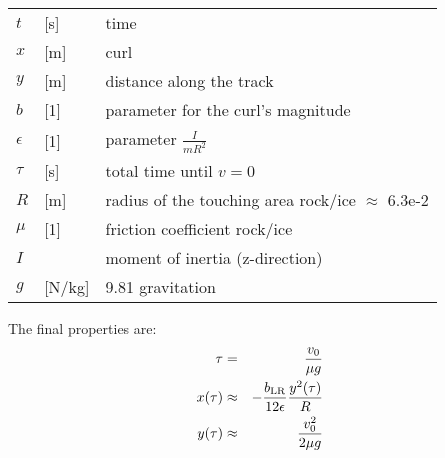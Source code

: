 \bigskip
\begin{tabular}{lll}
$t$		& [s] & time \\
$x$		& [m] & curl \\
$y$		& [m] & distance along the track \\
$b$ 	& [1] & parameter for the curl's magnitude \\
$\epsilon$	& [1] & parameter $ \frac{ I }{ mR^2 } $\\
$\tau$	& [s] & total time until $v=0$ \\
$R$		& [m] & radius of the touching area rock/ice $\approx$ 6.3e-2 \\
$\mu$	& [1] & friction coefficient rock/ice \\
$I$		&  & moment of inertia (z-direction) \\
$g$		& [N/kg] & 9.81 gravitation \\
\end{tabular}
\bigskip

The final properties are:
\begin{eqnarray}
\eqlab{denTau} 
\tau    & = &     \frac{ v_0 }{ \mu g } \\
x(\tau) &\approx& - \frac{ b_\mathrm{LR} }{ 12\epsilon } \frac{y^2(\tau) }{R} \\
y(\tau) &\approx& \frac{ v_0^2 }{ 2\mu g }
\end{eqnarray}
